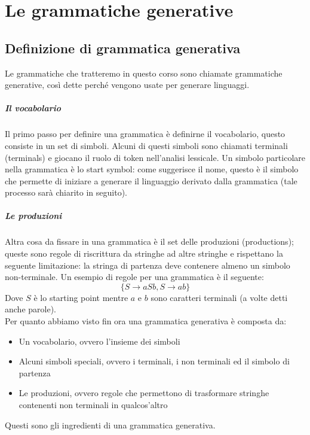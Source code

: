 \documentclass[class=book, crop=false, oneside, 12pt]{standalone}
\begin{document}
\chapter{Le grammatiche generative}

\section{Definizione di grammatica generativa}
Le grammatiche che tratteremo in questo corso sono chiamate grammatiche generative, così dette perché vengono usate per generare linguaggi.

\paragraph{Il vocabolario}
Il primo passo per definire una grammatica è definirne il vocabolario, questo consiste in un set di simboli. Alcuni di questi simboli sono chiamati terminali (terminals) e giocano il ruolo di token nell’analisi lessicale. Un simbolo particolare nella grammatica è lo start symbol: come suggerisce il nome, questo è il simbolo che permette di iniziare a generare il linguaggio derivato dalla grammatica (tale processo sarà chiarito in seguito).

\paragraph{Le produzioni}
Altra cosa da fissare in una grammatica è il set delle produzioni (productions); queste sono regole di riscrittura da stringhe ad altre stringhe e rispettano la seguente limitazione: la stringa di partenza deve contenere almeno un simbolo non-terminale. Un esempio di regole per una grammatica è il seguente:
\begin{equation}
    \{S \to aSb, S \to ab\}
    \label{produzioni_esempio_0}
\end{equation}
Dove \(S\) è lo starting point mentre \(a\) e \(b\) sono caratteri terminali (a volte detti anche parole).\\
Per quanto abbiamo visto fin ora una grammatica generativa è composta da:
\begin{itemize}
    \item Un vocabolario, ovvero l'insieme dei simboli
    \item Alcuni simboli speciali, ovvero i terminali, i non terminali ed il simbolo di partenza
    \item Le produzioni, ovvero regole che permettono di trasformare stringhe contenenti non terminali in qualcos’altro
\end{itemize}
Questi sono gli ingredienti di una grammatica generativa.
\end{document}

